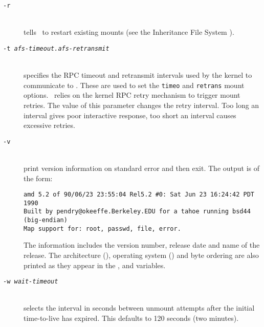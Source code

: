 \begin{description}
\item[\tt -r]\mbox{}\\
tells \amd\ to restart existing mounts (see the Inheritance File System ).

\item[\tt -t \em afs-timeout.afs-retransmit]\mbox{}\\
specifies the RPC timeout and retransmit intervals used by the kernel to communicate
to \amd.  These are used to set the {\tt timeo} and {\tt retrans} mount options.
\Amd\ relies on the kernel RPC retry mechanism to trigger mount retries.
The value of this parameter changes the retry interval.  Too long an interval
gives poor interactive response, too short an interval causes excessive
retries.

\item[\tt -v]\mbox{}\\
print version information on standard error and then exit.
The output is of the form:
\begin{verbatim}
amd 5.2 of 90/06/23 23:55:04 Rel5.2 #0: Sat Jun 23 16:24:42 PDT 1990
Built by pendry@okeeffe.Berkeley.EDU for a tahoe running bsd44 (big-endian)
Map support for: root, passwd, file, error.
\end{verbatim}
The information includes the version number, release date and name
of the release.
The architecture (\see {}), operating system (\see {})
and byte ordering are also printed as they appear in the ,
 and  variables.

\item[\tt -w \em wait-timeout]\label{opt:wait}\mbox{}\\
selects the interval in seconds between unmount attempts after
the initial time-to-live has expired.
This defaults to 120 seconds (two minutes).


\end{description}
